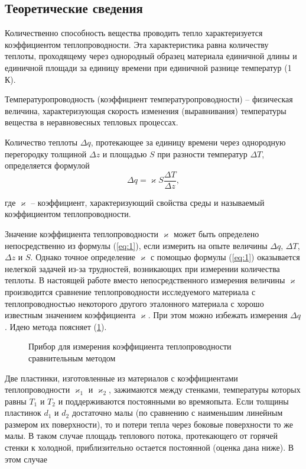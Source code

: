 \documentclass[a4paper,11.5pt]{article} %
\begin{document}
\subsection{Теоретические сведения}

Количественно способность вещества проводить тепло характеризуется коэффициентом теплопроводности. Эта характеристика равна количеству теплоты, проходящему через однородный образец материала единичной длины и единичной площади за единицу времени при единичной разнице температур (1 К).

Температуропроводность (коэффициент температуропроводности) -- физическая величина, характеризующая скорость изменения (выравнивания) температуры вещества в неравновесных тепловых процессах. 

Количество теплоты $\Delta q$, протекающее за единицу времени через однородную перегородку толщиной $\Delta z$ и площадью $S$ при разности температур $\Delta T$, определяется формулой
\begin{equation}
	\Delta q =  \varkappa S \frac{\Delta T}{\Delta z},
	\label{eq:1}
\end{equation}

где $\varkappa$ -- коэффициент, характеризующий свойства среды и называемый коэффициентом теплопроводности.

Значение коэффициента теплопроводности $\varkappa$ может быть определено непосредственно из формулы (\ref{eq:1}), если измерить на опыте величины $\Delta q$, $\Delta T$, $\Delta z$ и $S$. Однако точное определение $\varkappa$ с помощью формулы (\ref{eq:1}) оказывается нелегкой задачей из-за трудностей, возникающих при измерении количества теплоты. В настоящей работе вместо непосредственного измерения величины $\varkappa$ производится сравнение теплопроводности исследуемого материала с теплопроводностью некоторого другого эталонного материала с хорошо известным значением коэффициента $\varkappa$. При этом можно избежать измерения $\Delta q$. Идею метода поясняет (\ref{pic:1}).

\begin{figure}[h]
	\caption{Прибор для измерения коэффициента теплопроводности
сравнительным методом}
	\label{pic:1}
\end{figure}

Две пластинки, изготовленные из материалов с коэффициентами теплопроводности $\varkappa_1$ и $\varkappa_2$, зажимаются между стенками, температуры которых равны $T_1$ и $T_2$ и поддерживаются постоянными во времяопыта. Если толщины пластинок $d_1$ и $d_2$ достаточно малы (по сравнению с наименьшим линейным размером их поверхности), то и потери тепла через боковые поверхности то
же малы. В таком случае площадь теплового потока, протекающего от горячей стенки к холодной, приблизительно остается постоянной (оценка дана ниже). В этом случае
\end{document}
